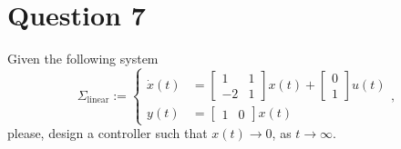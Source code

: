 \documentclass[11pt,a4paper,titlepage]{article}
\begin{document}
\section{Question 7}
Given the following system
\begin{equation}
	\Sigma_{\text{linear}} := \begin{cases}
		\dot x(t) &= \begin{bmatrix}1 & 1 \\ -2 & 1\end{bmatrix}x(t) + \begin{bmatrix}0 \\ 1 \end{bmatrix} u(t)\\
			y(t) &= \begin{bmatrix}1 & 0\end{bmatrix}x(t)
	\end{cases},
\label{eq: sigmalin}
\end{equation}
please, design a controller such that $x(t) \to 0$, as $t\to\infty$.
\end{document}

